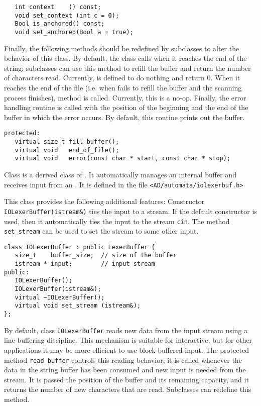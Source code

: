 \begin{verbatim}
   int context    () const;
   void set_context (int c = 0);
   Bool is_anchored() const;
   void set_anchored(Bool a = true);
\end{verbatim}

Finally, the following methods should be redefined by subclasses
to alter the behavior of this class.  By default, the class 
calls  when it reaches the end of the string; subclasses
can use this method to refill the buffer and return the number of
characters read.  Currently,  is defined to do nothing 
and return 0.  When it reaches the end of the file 
(i.e. when  fails to refill the buffer and the 
scanning process finishes), method  is called.
Currently, this is a no-op.  Finally, the error handling routine
 is called with the position of the beginning and the end
of the buffer in which the error occurs.  By default, this routine
prints out the buffer. 

\begin{verbatim}
protected:           
   virtual size_t fill_buffer();
   virtual void   end_of_file();
   virtual void   error(const char * start, const char * stop);
\end{verbatim}


  Class  
is a derived class of .  It 
automatically manages an internal buffer and receives input from
an .  It is defined in the file \verb|<AD/automata/iolexerbuf.h>|

This class provides the following additional features:
Constructor \verb|IOLexerBuffer(istream&)| ties the input to a
stream.  If the default constructor is used, then it automatically
ties the input to the stream \verb|cin|.  The method \verb|set_stream|
can be used to set the stream to some other input. 

\begin{verbatim}
class IOLexerBuffer : public LexerBuffer {
   size_t    buffer_size;  // size of the buffer
   istream * input;        // input stream
public:
   IOLexerBuffer();    
   IOLexerBuffer(istream&);    
   virtual ~IOLexerBuffer();
   virtual void set_stream (istream&);
};
\end{verbatim}

By default, class \verb|IOLexerBuffer| reads new data from the input
stream using a line buffering discipline.  This mechanism is suitable
for interactive, but for other applications it may be more efficient
to use block buffered input.  The protected method 
\verb|read_buffer| controls this reading behavior; it
is called whenever the data in the string buffer has been
consumed and new input is needed from the stream.  It is
passed the position of the buffer and its remaining capacity,
and it returns the number of new characters that are read.  Subclasses
can redefine this method. 

